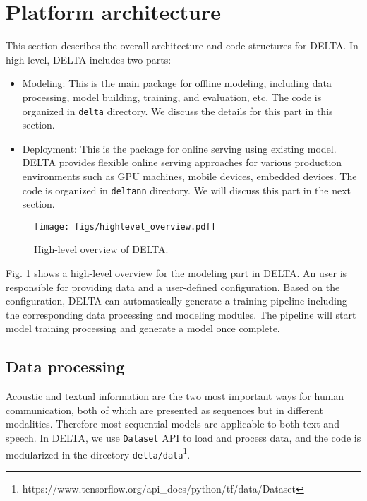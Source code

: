 \documentclass{article}
\begin{document}
\section{Platform architecture}
This section describes the overall architecture and code structures for DELTA. In high-level, DELTA includes two parts:

\begin{itemize}
    \item Modeling: This is the main package for offline modeling, including data processing, model building, training, and evaluation, etc. The code is organized in \texttt{delta} directory. We discuss the details for this part in this section.

    \item Deployment: This is the package for online serving using existing model. DELTA provides flexible online serving approaches for various production environments such as GPU machines, mobile devices, embedded devices. The code is organized in \texttt{deltann} directory. We will discuss this part in the next section.
\end{itemize}



\begin{figure}[htbp]
  \centering
\texttt{[image: figs/highlevel\_overview.pdf]}
  \caption{High-level overview of DELTA.}
  \label{fig:highlevel_delta}
\end{figure}


Fig. \ref{fig:highlevel_delta} shows a high-level overview for the modeling part in DELTA. An user is responsible for providing data and a user-defined configuration. Based on the configuration, DELTA can automatically generate a training pipeline including the corresponding data processing and modeling modules. The pipeline will start model training processing and generate a model once complete.

\subsection{Data processing} \label{sec:data}
Acoustic and textual information are the two most important ways for human communication, both of which are presented as sequences but in different modalities. Therefore most sequential models are applicable to both text and speech. In DELTA, we use \texttt{Dataset} API to load and process data, and the code is modularized in the directory \texttt{delta/data}\footnote{https://www.tensorflow.org/api\_docs/python/tf/data/Dataset}.
\end{document}
